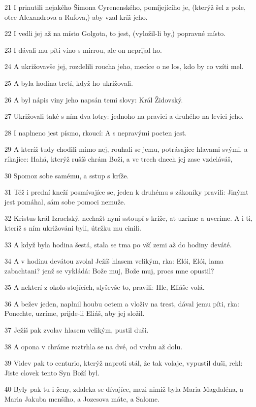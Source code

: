 \par 21 I prinutili nejakého Šimona Cyrenenského, pomíjejícího je, (kterýž šel z pole, otce Alexandrova a Rufova,) aby vzal kríž jeho.
\par 22 I vedli jej až na místo Golgota, to jest, (vyložil-li by,) popravné místo.
\par 23 I dávali mu píti víno s mirrou, ale on neprijal ho.
\par 24 A ukrižovavše jej, rozdelili roucha jeho, mecíce o ne los, kdo by co vzíti mel.
\par 25 A byla hodina tretí, když ho ukrižovali.
\par 26 A byl nápis viny jeho napsán temi slovy: Král Židovský.
\par 27 Ukrižovali také s ním dva lotry: jednoho na pravici a druhého na levici jeho.
\par 28 I naplneno jest písmo, rkoucí: A s nepravými pocten jest.
\par 29 A kteríž tudy chodili mimo nej, rouhali se jemu, potrásajíce hlavami svými, a ríkajíce: Hahá, kterýž rušíš chrám Boží, a ve trech dnech jej zase vzdeláváš,
\par 30 Spomoz sobe samému, a sstup s kríže.
\par 31 Též i prední kneží posmívajíce se, jeden k druhému s zákoníky pravili: Jinýmt jest pomáhal, sám sobe pomoci nemuže.
\par 32 Kristus král Izraelský, nechažt nyní sstoupí s kríže, at uzríme a uveríme. A i ti, kteríž s ním ukrižováni byli, útržku mu cinili.
\par 33 A když byla hodina šestá, stala se tma po vší zemi až do hodiny deváté.
\par 34 A v hodinu devátou zvolal Ježíš hlasem velikým, rka: Elói, Elói, lama zabachtani? jenž se vykládá: Bože muj, Bože muj, procs mne opustil?
\par 35 A nekterí z okolo stojících, slyševše to, pravili: Hle, Eliáše volá.
\par 36 A bežev jeden, naplnil houbu octem a vloživ na trest, dával jemu píti, rka: Ponechte, uzríme, prijde-li Eliáš, aby jej složil.
\par 37 Ježíš pak zvolav hlasem velikým, pustil duši.
\par 38 A opona v chráme roztrhla se na dvé, od vrchu až dolu.
\par 39 Videv pak to centurio, kterýž naproti stál, že tak volaje, vypustil duši, rekl: Jiste clovek tento Syn Boží byl.
\par 40 Byly pak tu i ženy, zdaleka se dívajíce, mezi nimiž byla Maria Magdaléna, a Maria Jakuba menšího, a Jozesova máte, a Salome.
